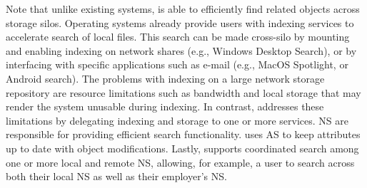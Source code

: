 Note that unlike existing systems, \system is able to efficiently find related objects across storage silos. Operating systems already provide users with indexing services to accelerate search of local files. This search can be made cross-silo by mounting and enabling indexing on network shares (e.g., Windows Desktop Search), or by interfacing with specific applications such as e-mail (e.g., MacOS Spotlight, or Android search). The problems with indexing on a large network storage repository are resource limitations such as bandwidth and local storage that may render the system unusable during indexing. In contrast, \system addresses these limitations by delegating indexing and storage to one or more services.
NS are responsible for providing efficient search functionality. \system uses AS to keep attributes up to date with object modifications. Lastly, \system supports coordinated search among one or more local and remote NS, allowing, for example, a user to search across both their local NS as well as their employer's NS.





